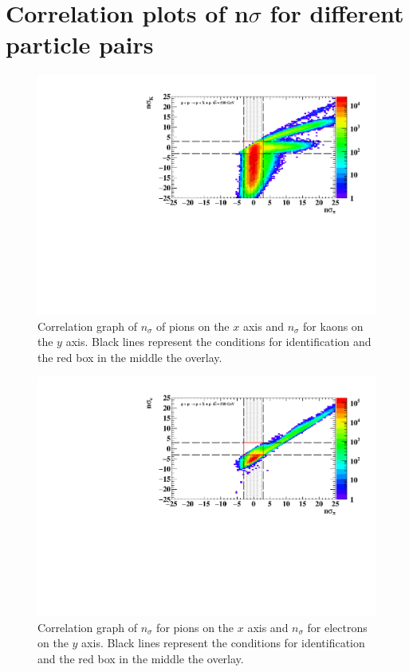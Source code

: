 \chapter{Correlation plots of n$\sigma$ for different particle pairs}
\label{appendixB}
\FloatBarrier
\begin{figure}[ht]
    \centering
    \includegraphics[width=1\textwidth]{figures/hNSigmaPiKcorr.pdf}
    \caption[Correlation graph of $n\sigma_{\pi}$ and $n\sigma_{K}$ of measured particles]{Correlation graph of $n_{\sigma}$ of pions on the $x$ axis and $n_{\sigma}$ for kaons on the $y$ axis. Black lines represent the conditions for identification and the red box in the middle the overlay.}
    \label{a1}
\end{figure}
\FloatBarrier

\FloatBarrier
\begin{figure}[ht]
    \centering
    \includegraphics[width=1\textwidth]{figures/hNSigmaPiecorr.pdf}
    \caption[Correlation graph of $n\sigma_{\pi}$ and $n\sigma_{e}$ of measured particles]{Correlation graph of $n_{\sigma}$ for pions on the $x$ axis and $n_{\sigma}$ for electrons on the $y$ axis. Black lines represent the conditions for identification and the red box in the middle the overlay.}
    \label{a2}
\end{figure}
\FloatBarrier

